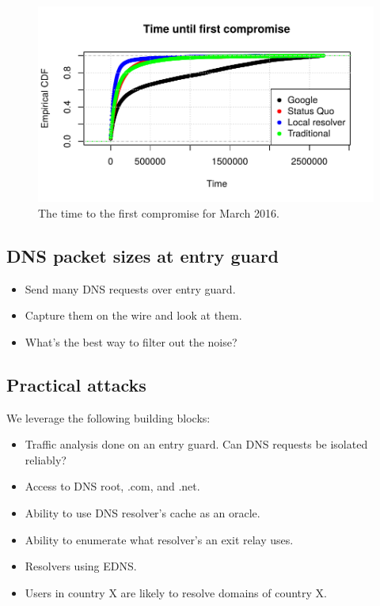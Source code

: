 \begin{figure}[t]
	\centering
	\includegraphics[width=0.75\linewidth]{figures/time-until-compromised.pdf}
	\caption{The time to the first compromise for March 2016.}
	\label{fig:time-to-first-comp}
\end{figure}


\subsection{DNS packet sizes at entry guard}
\begin{itemize}
	\item Send many DNS requests over entry guard.
	\item Capture them on the wire and look at them.
	\item What's the best way to filter out the noise?
\end{itemize}

\subsection{Practical attacks}
We leverage the following building blocks:
\begin{itemize}
	\item Traffic analysis done on an entry guard.  Can DNS requests be isolated
		reliably?
	\item Access to DNS root, .com, and .net.
	\item Ability to use DNS resolver's cache as an oracle.
	\item Ability to enumerate what resolver's an exit relay uses.
	\item Resolvers using EDNS.
	\item Users in country X are likely to resolve domains of country X.
\end{itemize}
